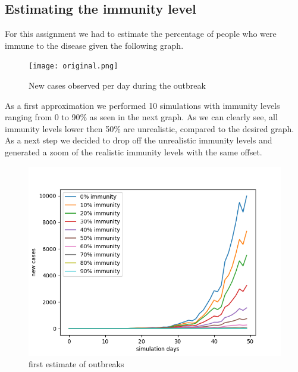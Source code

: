 \documentclass[runningheads]{llncs}
\begin{document}
	\subsection{Estimating the immunity level}
	For this assignment we had to estimate the percentage of people who were immune to the disease given the following graph.
	\\ 
	\begin{figure}[h!]
		\texttt{[image: original.png]}
		\caption{New cases observed per day during the outbreak}
	\end{figure}
	\newpage
	As a first approximation we performed 10 simulations with immunity levels ranging from 0 to 90\% as seen in the next graph. As we can clearly see, all immunity levels lower then 50\% are unrealistic, compared to the desired graph. As a next step we decided to drop off the unrealistic immunity levels and generated a zoom of the realistic immunity levels with the same offset.
	\begin{figure}
		\includegraphics[width=\textwidth]{test_immunity_0-100.png}
		\caption{first estimate of outbreaks}
	\end{figure}
	\newpage
	
\end{document}

